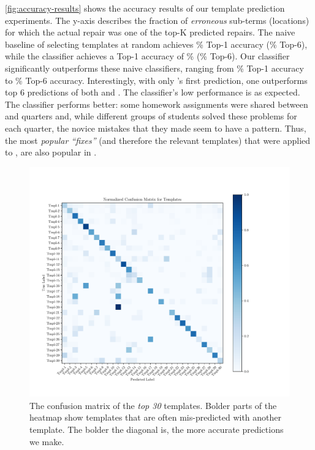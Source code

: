 %
\autoref{fig:accuracy-results} shows the accuracy results of our template
prediction experiments. The y-axis describes the fraction of \emph{erroneous}
sub-terms (locations) for which the actual repair was one of the top-K predicted
repairs.
%
The naive baseline of selecting templates at random achieves
\RandomTopOne\% Top-1 accuracy (\RandomTopSix\% Top-6), while
the \popular classifier achieves a Top-1 accuracy of \PopularTopOne\%
(\PopularTopSix\% Top-6).
%
Our \dnn classifier significantly outperforms these naive
classifiers, ranging from \DnnTopOne\% Top-1 accuracy to
\DnnTopSix\% Top-6 accuracy.
%
Interestingly, with only \dnn's first prediction, one
outperforms top 6 predictions of both \random and \popular.
%
The \random classifier's low performance is as expected.
%
The \popular classifier performs better: some homework assignments
were shared between \SPRING and \FALL quarters and, while different
groups of students solved these problems for each quarter, the novice
mistakes that they made seem to have a pattern. Thus, the most
\emph{popular ``fixes''} (and therefore the relevant templates)
that were applied to \SPRING, are also popular in \FALL.



\begin{figure}[t]
  \centering
  \includegraphics[trim={30 40 100 70},clip,width=\linewidth]{evaluation-conf-matrix.pdf}
  \caption{The confusion matrix of the \emph{top 30} templates. Bolder parts of
  the heatmap show templates that are often mis-predicted with another template.
  The bolder the diagonal is, the more accurate predictions we make.}
  \label{fig:conf-matrix}
\end{figure}

